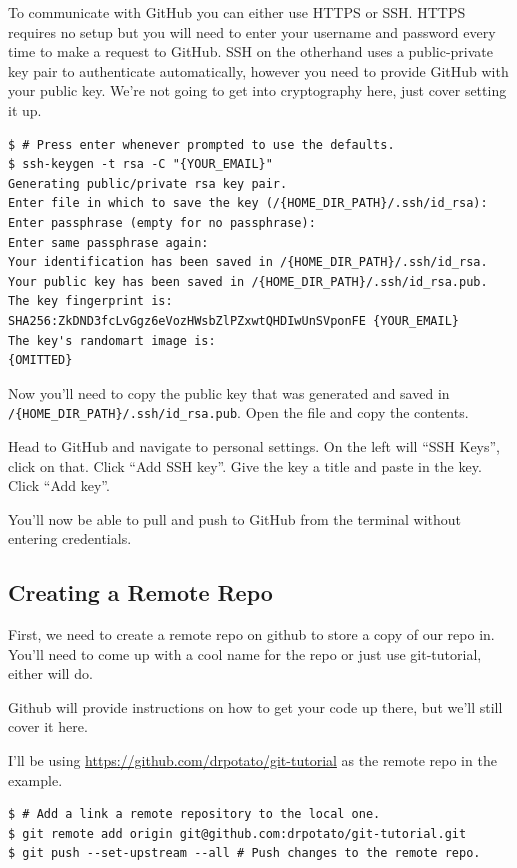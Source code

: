 \documentclass{tufte-handout}
\begin{document}
\noindent To communicate with GitHub you can either use HTTPS or SSH. HTTPS requires no setup but you will need to enter your username and password every time to make a request to GitHub. SSH on the otherhand uses a public-private key pair to authenticate automatically, however you need to provide GitHub with your public key. We're not going to get into cryptography here, just cover setting it up.

\begin{lstlisting}
$ # Press enter whenever prompted to use the defaults.
$ ssh-keygen -t rsa -C "{YOUR_EMAIL}"
Generating public/private rsa key pair.
Enter file in which to save the key (/{HOME_DIR_PATH}/.ssh/id_rsa):
Enter passphrase (empty for no passphrase):
Enter same passphrase again:
Your identification has been saved in /{HOME_DIR_PATH}/.ssh/id_rsa.
Your public key has been saved in /{HOME_DIR_PATH}/.ssh/id_rsa.pub.
The key fingerprint is:
SHA256:ZkDND3fcLvGgz6eVozHWsbZlPZxwtQHDIwUnSVponFE {YOUR_EMAIL}
The key's randomart image is:
{OMITTED}
\end{lstlisting}

Now you'll need to copy the public key that was generated and saved in \lstinline!/{HOME_DIR_PATH}/.ssh/id_rsa.pub!. Open the file and copy the contents.

Head to GitHub and navigate to personal settings. On the left will ``SSH Keys'', click on that. Click ``Add SSH key''. Give the key a title and paste in the key. Click ``Add key''.

You'll now be able to pull and push to GitHub from the terminal without entering credentials.

\subsection{Creating a Remote Repo}

\noindent First, we need to create a remote repo on github to store a copy of our repo in. You'll need to come up with a cool name for the repo or just use git-tutorial, either will do.

\noindent Github will provide instructions on how to get your code up there, but we'll still cover it here.

\noindent I'll be using \url{https://github.com/drpotato/git-tutorial} as the remote repo in the example.

\begin{lstlisting}
$ # Add a link a remote repository to the local one.
$ git remote add origin git@github.com:drpotato/git-tutorial.git
$ git push --set-upstream --all # Push changes to the remote repo.
\end{lstlisting}
\end{document}
